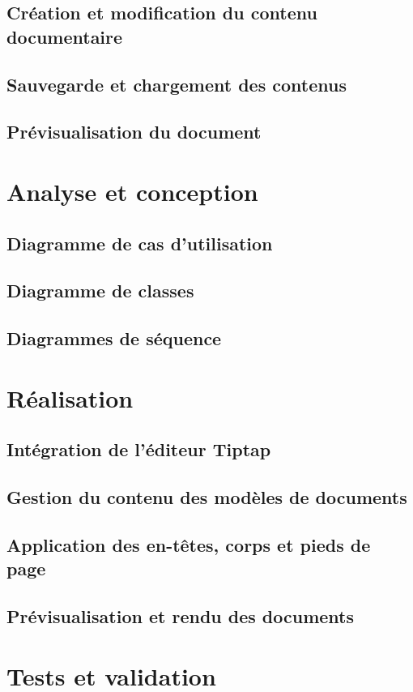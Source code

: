 \documentclass[12pt,a4paper]{report}
\begin{document}
\subsection{Création et modification du contenu documentaire}
\subsection{Sauvegarde et chargement des contenus}
\subsection{Prévisualisation du document}
\section{Analyse et conception}
\subsection{Diagramme de cas d'utilisation}
\subsection{Diagramme de classes}
\subsection{Diagrammes de séquence}
\section{Réalisation}
\subsection{Intégration de l'éditeur Tiptap}
\subsection{Gestion du contenu des modèles de documents}
\subsection{Application des en-têtes, corps et pieds de page}
\subsection{Prévisualisation et rendu des documents}
\section{Tests et validation}
\end{document}
